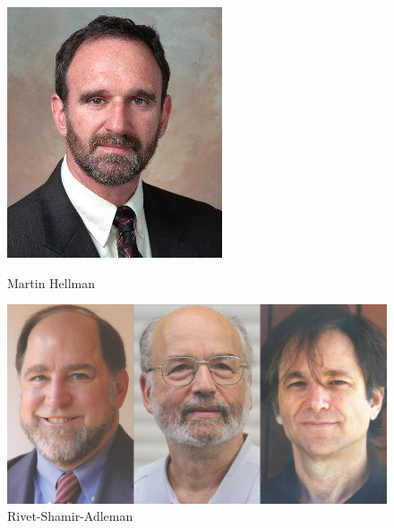 \documentclass{article}
\begin{document}
\begin{figure}[hb]
  \centering
  \begin{minipage}[hb]{0.3\textwidth}
    \includegraphics[width=\textwidth]{Martin-Hellman.jpg}
    \caption{Martin Hellman}
  \end{minipage}
  \hfill
  \begin{minipage}[hb]{0.3\textwidth}
    \includegraphics[width=\textwidth]{RSA.jpg}
    \caption{Rivet-Shamir-Adleman}
  \end{minipage}

\end{figure}
\end{document}
